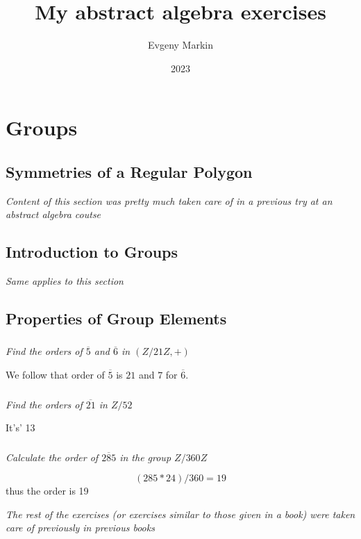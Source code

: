 \documentclass[11pt,oneside,titlepage]{book}
\title{My abstract algebra exercises}
\author{Evgeny Markin}
\date{2023}
\begin{document}
\maketitle
\tableofcontents

\chapter{Groups}

\section{Symmetries of  a Regular Polygon}

\textit{Content of this section was pretty much taken care of in a previous try at an
  abstract algebra coutse}

\section{Introduction to Groups}

\textit{Same applies to this section}

\section{Properties of Group Elements}

\subsection{}

\textit{Find the orders of $\overline{5}$ and $\overline{6}$ in $(Z/21Z, +)$}

We follow that order of $\overline{5}$ is $21$ and $7$ for $\overline{6}$.

\subsection{}

\textit{Find the orders of $\overline{21}$ in $Z/52$}

It's' 13

\subsection{}

\textit{Calculate the order of $\overline{285}$ in the group $Z/360Z$}

$$(285 * 24) / 360 = 19$$
thus the order is 19

\textit{The rest of the exercises (or exercises similar to those given in a book) were
taken care of previously in previous books}

\section{}
\end{document}
